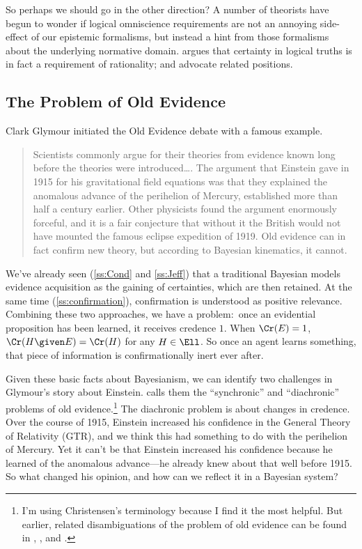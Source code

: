 So perhaps we should go in the other direction? A number of theorists have begun to wonder if logical omniscience requirements are not an annoying side-effect of our epistemic formalisms, but instead a hint from those formalisms about the underlying normative domain. \citet{SmithiesIdeal} argues that certainty in logical truths is in fact a requirement of rationality; \citet{TitelbaumRight} and \citet{LittlejohnSense} advocate related positions.


\subsection{The Problem of Old Evidence}
Clark Glymour initiated the Old Evidence debate with a famous example.
\begin{quote}
Scientists commonly argue for their theories from evidence known long before the theories were introduced\ldots. The argument that Einstein gave in 1915 for his gravitational field equations was that they explained the anomalous advance of the perihelion of Mercury, established more than half a century earlier. Other physicists found the argument enormously forceful, and it is a fair conjecture that without it the British would not have mounted the famous eclipse expedition of 1919. Old evidence can in fact confirm new theory, but according to Bayesian kinematics, it cannot. \citep[pp.\ 306--7]{GlymourTheory}
\end{quote}
We've already seen (\autoref{ss:Cond} and \autoref{ss:Jeff}) that a traditional Bayesian models evidence acquisition as the gaining of certainties, which are then retained. At the same time (\autoref{ss:confirmation}), confirmation is understood as positive relevance. Combining these two approaches, we have a problem:\ once an evidential proposition has been learned, it receives credence $1$. When $\Cr(E)=1$, $\Cr(H \given E)=\Cr(H)$ for any $H \in \Ell$. So once an agent learns something, that piece of information is confirmationally inert ever after.

Given these basic facts about Bayesianism, we can identify two challenges in Glymour's story about Einstein. \citet{ChristensenMeasuring} calls them the ``synchronic'' and ``diachronic'' problems of old evidence.\footnote
{I'm using Christensen's terminology because I find it the most helpful. But earlier, related disambiguations of the problem of old evidence can be found in \citet{Garber}, \citet{EellsOldEvidence}, and \citet{ZyndaOld}.}
The diachronic problem is about changes in credence. Over the course of 1915, Einstein increased his confidence in the General Theory of Relativity (GTR), and we think this had something to do with the perihelion of Mercury. Yet it can't be that Einstein increased his confidence because he learned of the anomalous advance---he already knew about that well before 1915. So what changed his opinion, and how can we reflect it in a Bayesian system?

